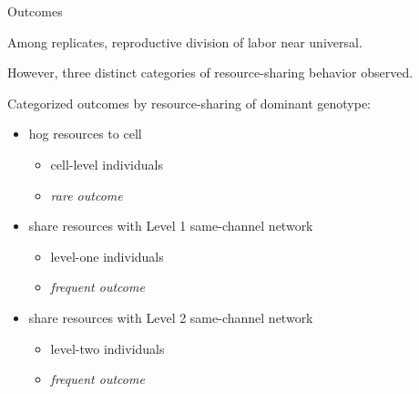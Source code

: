 \begin{frame}{Outcomes}

Among replicates, reproductive division of labor near universal.

\pause
\vspace{2ex}

However, three distinct categories of resource-sharing behavior observed.

\pause
\vspace{2ex}

Categorized outcomes by resource-sharing of dominant genotype:
\begin{itemize}[<+->]
\item hog resources to cell
\pause
\begin{itemize}
\item cell-level individuals
\item \textit{rare outcome}
\end{itemize}
\item share resources with Level 1 same-channel network
\pause
\begin{itemize}
\item level-one individuals
\item \textit{frequent outcome}
\end{itemize}
\item share resources with Level 2 same-channel network
\pause
\begin{itemize}
\item level-two individuals
\item \textit{frequent outcome}
\end{itemize}
\end{itemize}

\end{frame}


